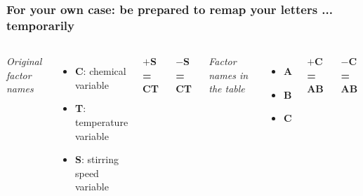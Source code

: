 \begin{frame}\frametitle{For your own case: be prepared to remap your letters ... temporarily}
	\begin{columns}[b]
			\emph{Original factor names}
			
			\begin{itemize}
				\item	\textbf{C}: chemical variable
				\item	\textbf{T}: temperature variable
				\item	\textbf{S}: stirring speed variable
			\end{itemize}
			
			\vspace{1cm}
			\textbf{$+$S = CT}
			
			\vspace{1cm}
			\textbf{$-$S = CT}
			
			\emph{Factor names in the table}
			
			\begin{itemize}
				\item	\textbf{A}
				\item	\textbf{B}
				\item	\textbf{C}
			\end{itemize}
			
			\vspace{1cm}
			\textbf{$+$C = AB}
			
			\vspace{1cm}
			\textbf{$-$C = AB}
	\end{columns}	
\end{frame}

